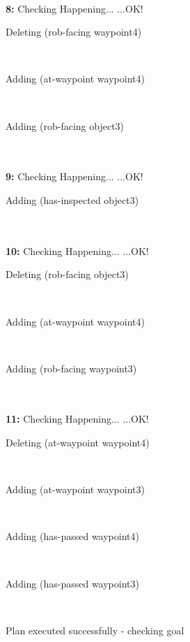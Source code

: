 \documentclass[a4paper,12pt]{article}
\newcommand{\atime}[1]{{\bf #1:}}
\newcommand{\exprn}[1]{{\sf #1}}
\newcommand{\checkhappening}{Checking Happening... }
\newcommand{\listrow}[1]{\begin{minipage}[t]{11.5cm} #1 \end{minipage}}
\newcommand{\happeningOK}{...OK!}
\newcommand{\adding}[1]{\listrow{Adding \exprn{#1} }}
\newcommand{\deleting}[1]{\listrow{Deleting \exprn{#1} }}
\begin{document}
\begin{tabbing}
\\
\atime{8} \> \checkhappening\happeningOK\\
 \> \deleting{(rob-facing waypoint4)}\\
 \> \adding{(at-waypoint waypoint4)}\\
 \> \adding{(rob-facing object3)}\\
\\
\atime{9} \> \checkhappening\happeningOK\\
 \> \adding{(has-inspected object3)}\\
\\
\atime{10} \> \checkhappening\happeningOK\\
 \> \deleting{(rob-facing object3)}\\
 \> \adding{(at-waypoint waypoint4)}\\
 \> \adding{(rob-facing waypoint3)}\\
\\
\atime{11} \> \checkhappening\happeningOK\\
 \> \deleting{(at-waypoint waypoint4)}\\
 \> \adding{(at-waypoint waypoint3)}\\
 \> \adding{(has-passed waypoint4)}\\
 \> \adding{(has-passed waypoint3)}\\
\end{tabbing}
Plan executed successfully - checking goal\\
\\
\end{document}
